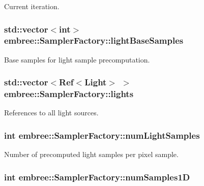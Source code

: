 Current iteration. 

\hypertarget{classembree_1_1_sampler_factory_a188a3e7b13c69d88c0d6a9e0192d84f4}{
\subsubsection[{lightBaseSamples}]{\setlength{\rightskip}{0pt plus 5cm}std::vector$<$int$>$ {\bf embree::SamplerFactory::lightBaseSamples}}}
\label{classembree_1_1_sampler_factory_a188a3e7b13c69d88c0d6a9e0192d84f4}


Base samples for light sample precomputation. 

\hypertarget{classembree_1_1_sampler_factory_aa965aa3f8efa69f3d6f43abc1b205045}{
\subsubsection[{lights}]{\setlength{\rightskip}{0pt plus 5cm}std::vector$<$Ref$<${\bf Light}$>$ $>$ {\bf embree::SamplerFactory::lights}}}
\label{classembree_1_1_sampler_factory_aa965aa3f8efa69f3d6f43abc1b205045}


References to all light sources. 

\hypertarget{classembree_1_1_sampler_factory_adec6d83718e9bfc86f8fc7fc7b366dff}{
\subsubsection[{numLightSamples}]{\setlength{\rightskip}{0pt plus 5cm}int {\bf embree::SamplerFactory::numLightSamples}}}
\label{classembree_1_1_sampler_factory_adec6d83718e9bfc86f8fc7fc7b366dff}


Number of precomputed light samples per pixel sample. 

\hypertarget{classembree_1_1_sampler_factory_aadbd34d68f975f6821f189e73e78833a}{
\subsubsection[{numSamples1D}]{\setlength{\rightskip}{0pt plus 5cm}int {\bf embree::SamplerFactory::numSamples1D}}}
\label{classembree_1_1_sampler_factory_aadbd34d68f975f6821f189e73e78833a}


